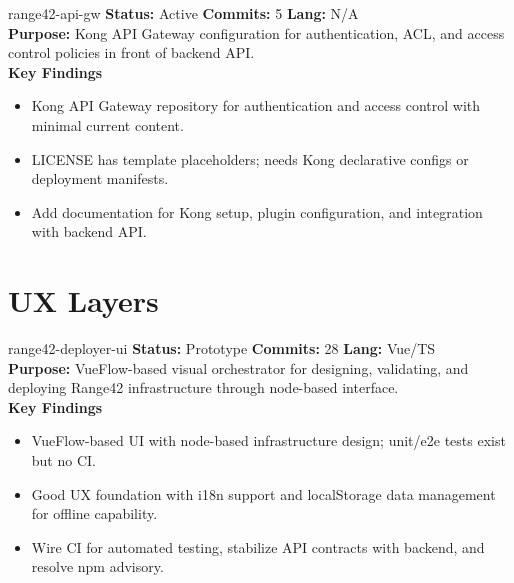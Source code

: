 \documentclass[aspectratio=169]{beamer}
\begin{document}
\begin{frame}{range42-api-gw \; }
  \textbf{Status:} Active \hfill \textbf{Commits:} 5 \hfill \textbf{Lang:} N/A\\[2mm]
  \textbf{Purpose:} Kong API Gateway configuration for authentication, ACL, and access control policies in front of backend API.\\[2mm]
  \textbf{Key Findings}
  \begin{itemize}
    \item Kong API Gateway repository for authentication and access control with minimal current content.
    \item LICENSE has template placeholders; needs Kong declarative configs or deployment manifests.
    \item Add documentation for Kong setup, plugin configuration, and integration with backend API.
  \end{itemize}
\end{frame}

\section{UX Layers}

\begin{frame}{range42-deployer-ui \; \faDrawPolygon}
  \textbf{Status:} Prototype \hfill \textbf{Commits:} 28 \hfill \textbf{Lang:} Vue/TS\\[2mm]
  \textbf{Purpose:} VueFlow-based visual orchestrator for designing, validating, and deploying Range42 infrastructure through node-based interface.\\[2mm]
  \textbf{Key Findings}
  \begin{itemize}
    \item VueFlow-based UI with node-based infrastructure design; unit/e2e tests exist but no CI.
    \item Good UX foundation with i18n support and localStorage data management for offline capability.
    \item Wire CI for automated testing, stabilize API contracts with backend, and resolve npm advisory.
  \end{itemize}
\end{frame}
\end{document}
